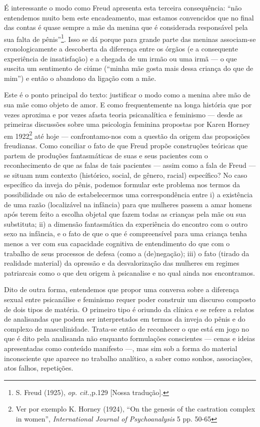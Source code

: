 É interessante o modo como Freud apresenta esta terceira consequência:
``não entendemos muito bem este encadeamento, mas estamos convencidos
que no final das contas é quase sempre a mãe da menina que é considerada
responsável pela sua falta de pênis''\footnote{S. Freud (1925),
  \emph{op. cit.,}p.129 {[}Nossa tradução{]}.}. Isso se dá porque para
grande parte das meninas associam-se cronologicamente a descoberta da
diferença entre os órgãos (e a consequente experiência de insatisfação)
e a chegada de um irmão ou uma irmã --- o que suscita um sentimento de
ciúme (``minha mãe gosta mais dessa criança do que de mim'') e então o
abandono da ligação com a mãe.

Este é o ponto principal do texto: justificar o modo como a menina abre
mão de sua mãe como objeto de amor. E como frequentemente na longa
história que por vezes aproxima e por vezes afasta teoria psicanalítica
e feminismo --- desde as primeiras discussões sobre uma psicologia
feminina propostas por Karen Horney em 1922\footnote{Ver por exemplo K.
  Horney (1924), ``On the genesis of the castration complex in women'',
  \emph{International Journal of Psychoanalysis} 5 pp. 50-65} até hoje
--- confrontamo-nos com a questão da origem das proposições freudianas.
Como conciliar o fato de que Freud propõe construções teóricas que
partem de produções fantasmáticas de suas e seus pacientes com o
reconhecimento de que as falas de tais pacientes --- assim como a fala de
Freud --- se situam num contexto (histórico, social, de gênero, racial)
específico? No caso específico da inveja do pênis, podemos formular
este problema nos termos da possibilidade ou não de estabelecermos uma
correspondência entre i) a existência de uma razão (localizável na
infância) para que mulheres passem a amar homens após terem feito a
escolha objetal que fazem todas as crianças pela mãe ou sua substituta;
ii) a dimensão fantasmática da experiência do encontro com o outro sexo
na infância, e o fato de que o que é compreensível para uma criança
tenha menos a ver com sua capacidade cognitiva de entendimento do que
com o trabalho de seus processos de defesa (como a (de)negação); iii) o
fato (tirado da realidade material) da opressão e da desvalorização das
mulheres em regimes patriarcais como o que deu origem à psicanalise e no
qual ainda nos encontramos.

Dito de outra forma, entendemos que propor uma conversa sobre a
diferença sexual entre psicanálise e feminismo requer poder construir um
discurso composto de dois tipos de matéria. O primeiro tipo é oriundo da
clínica e se refere a relatos de analisandas que podem ser interpretados
em termos da inveja do pênis e do complexo de masculinidade. Trata-se
então de reconhecer o que está em jogo no que é dito pela analisanda não
enquanto formulações conscientes --- cenas e ideias apresentadas como
conteúdo manifesto ---, mas sim sob a forma do material inconsciente que
aparece no trabalho analítico, a saber como sonhos, associações, atos
falhos, repetições.

